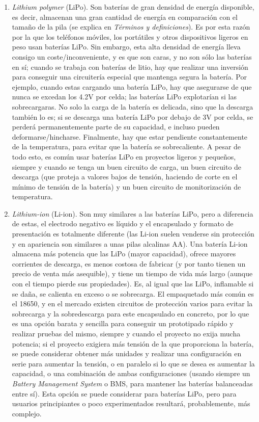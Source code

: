 \documentclass[12pt]{article}
\begin{document}
	\begin{enumerate}
		
		\item \textit{Lithium polymer} (LiPo).  Son baterías de gran densidad de energía disponible, es decir, almacenan una gran cantidad de energía en comparación con el tamaño de la pila (se explica en \textit{Términos y definiciones}). Es por esta razón por la que los teléfonos móviles, los portátiles y otros dispositivos ligeros en peso usan baterías LiPo. Sin embargo, esta alta densidad de energía lleva consigo un coste/inconveniente, y es que son caras, y no son sólo las baterías en sí; cuando se trabaja con baterías de litio, hay que realizar una inversión para conseguir una circuitería especial que mantenga segura la batería. Por ejemplo, cuando estas cargando una batería LiPo, hay que asegurarse de que nunca se excedan los 4.2V por celda; las baterías LiPo explotarían si las sobrecargaras. No solo la carga de la batería es delicada, sino que la descarga también lo es; si se descarga una batería LiPo por debajo de 3V por celda, se perderá permanentemente parte de su capacidad, e incluso pueden deformarse/hincharse. Finalmente, hay que estar pendiente constantemente de la temperatura, para evitar que la batería se sobrecaliente. A pesar de todo esto, es común usar baterías LiPo en proyectos ligeros y pequeños, siempre y cuando se tenga un buen circuito de carga, un buen circuito de descarga (que proteja a valores bajos de tensión, haciendo de corte en el mínimo de tensión de la batería) y un buen circuito de monitorización de temperatura. 
		
		\item \textit{Lithium-ion} (Li-ion). Son muy similares a las baterías LiPo, pero a diferencia de estas, el electrodo negativo es líquido y el encapsulado y formato de presentación es totalmente diferente (las Li-ion suelen venderse sin protección y en apariencia son similares a unas pilas alcalinas AA). Una batería Li-ion almacena más potencia que las LiPo (mayor capacidad), ofrece mayores corrientes de descarga, es menos costosa de fabricar (y por tanto tienen un precio de venta más asequible),  y tiene un tiempo de vida más largo (aunque con el tiempo pierde sus propiedades). Es, al igual que las LiPo, inflamable si se daña, se calienta en exceso o se sobrecarga. El empaquetado más común es el 18650, y en el mercado existen circuitos de protección varios para evitar la sobrecarga y la sobredescarga  para este encapsulado en concreto, por lo que es una opción barata y sencilla para conseguir un prototipado rápido y realizar pruebas del mismo, siempre y cuando el proyecto no exija mucha potencia; si el proyecto exigiera más tensión de la que proporciona la batería, se puede considerar obtener más unidades y realizar una configuración en serie para aumentar la tensión, o en paralelo si lo que se desea es aumentar la capacidad, o una combinación de ambas configuraciones (usando siempre un \textit{Battery Management System} o BMS, para mantener las baterías balanceadas entre sí). Esta opción se puede considerar para baterías LiPo, pero para usuarios principiantes o poco experimentados resultará, probablemente, más complejo.
		

\end{enumerate}
\end{document}
